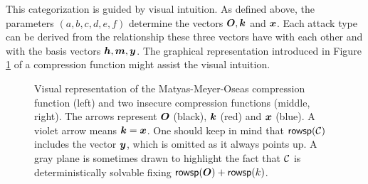 This categorization is guided by visual intuition.
As defined above, the parameters $(a,b,c,d,e,f)$ determine the vectors $\boldsymbol{O}, \boldsymbol k$ and $\boldsymbol x$.
Each attack type can be derived from the relationship these three vectors have with each other and with the basis vectors $\boldsymbol h, \boldsymbol m, \boldsymbol y$.
The graphical representation introduced in Figure \ref{fig:graphical_rep} of a compression function might assist the visual intuition.
\begin{figure}[ht]
\centering

\hspace{0.5cm}
\hspace{0.5cm}
\caption{
Visual representation of the Matyas-Meyer-Oseas compression function (left) and two insecure compression functions (middle, right).
The arrows represent $\boldsymbol{O}$ (black), $\boldsymbol k$ (red) and $\boldsymbol x$ (blue).
A violet arrow means $\boldsymbol k = \boldsymbol x$.
One should keep in mind that $\mathsf{rowsp}(\mathcal{C})$ includes the vector $\boldsymbol y$, which is omitted as it always points up.
A gray plane is sometimes drawn to highlight the fact that $\mathcal{C}$ is deterministically solvable fixing $\mathsf{rowsp}(\boldsymbol{O}) + \mathsf{rowsp}(k)$.
}
\label{fig:graphical_rep}
\end{figure}

